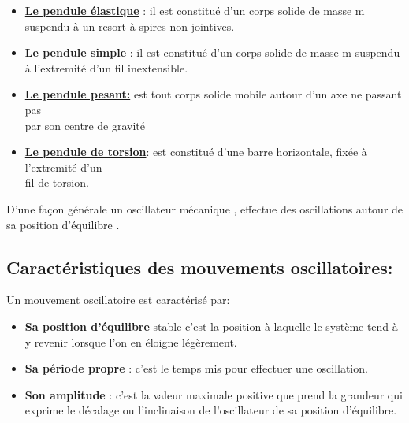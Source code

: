 \documentclass[12pt]{article}
\begin{document}
\begin{itemize}

	\item \textbf{\underline{Le pendule élastique}} : il est constitué d'un corps solide de masse m \\suspendu à un resort à spires non jointives.

	\item \textbf{\underline{Le pendule simple}} : il est constitué d'un corps solide de masse m suspendu \\à l'extremité d'un fil inextensible.
	\item  \textbf{\underline{Le pendule pesant:}} est tout corps solide mobile autour d'un axe ne passant pas\\ par son centre de gravité
	\item \textbf{\underline{Le pendule de torsion}}: est constitué d'une barre horizontale, fixée à l'extremité d'un \\fil de torsion.

\end{itemize}

D'une façon générale un oscillateur mécanique , effectue des oscillations autour de sa position d'équilibre .

\subsection{Caractéristiques des mouvements oscillatoires: }
Un mouvement oscillatoire est caractérisé par:
\begin{itemize}
	\item \textbf{Sa position d'équilibre }  stable c'est la position à laquelle le système tend à y revenir lorsque l'on en éloigne légèrement.
\item \textbf{Sa période propre} : c'est le temps mis pour effectuer une oscillation.
\item  \textbf{Son amplitude} : c'est la valeur maximale positive que prend la grandeur qui exprime le décalage ou l'inclinaison de l'oscillateur
de sa position d'équilibre.

\end{itemize}

\begin{center}
\end{center}
\end{document}
